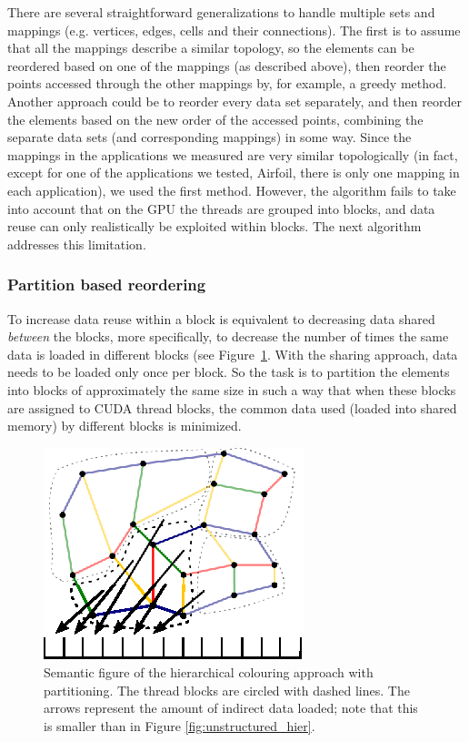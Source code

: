 There are several straightforward generalizations to handle multiple sets and
mappings (e.g. vertices, edges, cells and their connections).  The first is to
assume that all the mappings describe a similar topology, so the elements can be
reordered based on one of the mappings (as described above), then reorder the
points accessed through the other mappings by, for example, a greedy method.
Another approach could be to reorder every data set separately, and then reorder
the elements based on the new order of the accessed points, combining the
separate data sets (and corresponding mappings) in some way. Since the mappings
in the applications we measured are very similar topologically (in fact, except
for one of the applications we tested, Airfoil, there is only one mapping in 
each application), we used the first method. However, the algorithm fails to 
take into account that on the GPU the threads are grouped into blocks, and data 
reuse can only realistically be exploited within blocks. The next algorithm 
addresses this limitation.

\subsubsection{Partition based reordering}

\noindent To increase data reuse within a block is equivalent to decreasing 
data shared \emph{between} the blocks, more specifically, to decrease the 
number of times the same data is loaded in different blocks (see 
Figure~\ref{fig:unstructured_part}. With the sharing approach, data needs to be 
loaded only once per block. So the task is to partition the elements into 
blocks of approximately the same size in such a way that when these blocks are 
assigned to CUDA thread blocks, the common data used (loaded into shared 
memory) by different blocks is minimized.

\begin{figure}[Htpb]
  \centering
  \includegraphics{fig/svg/unstructured_part.eps}
  \caption{Semantic figure of the hierarchical colouring approach with
  partitioning. The thread blocks are circled with dashed lines. The arrows
  represent the amount of indirect data loaded; note that this is smaller than
  in Figure \ref{fig:unstructured_hier}.}
  \label{fig:unstructured_part}
\end{figure}

